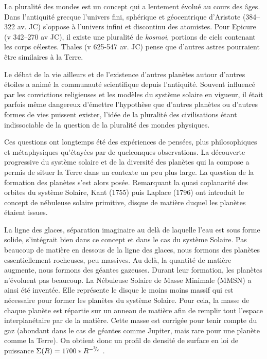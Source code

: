 


La pluralité des mondes est un concept qui a lentement évolué au cours des âges. Dans l'antiquité grecque l'univers fini, sphérique et géocentrique d'Aristote (384--322 av. JC) s'oppose à l'univers infini et discontinu des atomistes. Pour Epicure (v 342--270 av JC), il existe une pluralité de \textit{kosmoi}, portions de ciels contenant les corps célestes. Thales (v 625-547 av. JC) pense que d'autres astres pourraient être similaires à la Terre. 

Le débat de la vie ailleurs et de l'existence d'autres planètes autour d'autres étoiles a animé la communauté scientifique
depuis l'antiquité. Souvent influencé par les convictions religieuses et les modèles du système solaire en vigueur, il était
parfois même dangereux d'émettre l'hypothèse que d'autres planètes ou d'autres formes de vies puissent exister, l'idée de la
pluralité des civilisations étant indissociable de la question de la pluralité des mondes physiques. 

Ces questions ont longtemps été des expériences de pensées, plus philosophiques et métaphysiques qu'étayées par de quelconques observations. La découverte progressive du système solaire et de la diversité des planètes qui la compose a permis de situer la Terre dans un contexte un peu plus large. La question de la formation des planètes s'est alors posée. Remarquant la quasi coplanarité des orbites du système Solaire, Kant (1755) puis Laplace (1796) ont introduit le concept de nébuleuse solaire primitive, disque de matière duquel les planètes étaient issues. 

La ligne des glaces, séparation imaginaire au delà de laquelle l'eau est sous forme solide, s'intégrait bien dans ce concept et dans le cas du système Solaire. Pas beaucoup de matière en dessous de la ligne des glaces, nous formons des planètes essentiellement rocheuses, peu massives. Au delà, la quantité de matière augmente, nous formons des géantes gazeuses. Durant leur formation, les planètes n'évoluent pas beaucoup. La Nébuleuse Solaire de Masse Minimale (MMSN) a ainsi été inventée. Elle représente le disque le moins moins massif qui est nécessaire pour former les planètes du système Solaire. Pour cela, la masse de chaque planète est répartie sur un anneau de matière afin de remplir tout l'espace interplanétaire par de la matière. Cette masse est corrigée pour tenir compte du gaz (abondant dans le cas de géantes comme Jupiter, mais rare pour une planète comme la Terre). On obtient donc un profil de densité de surface en loi de puissance $\Sigma(R)=1700 * R^{-{{}^{3\!\!}/ _{\!2}}}$ \citep{
weidenschilling1977distribution, hayashi1981structure}.

